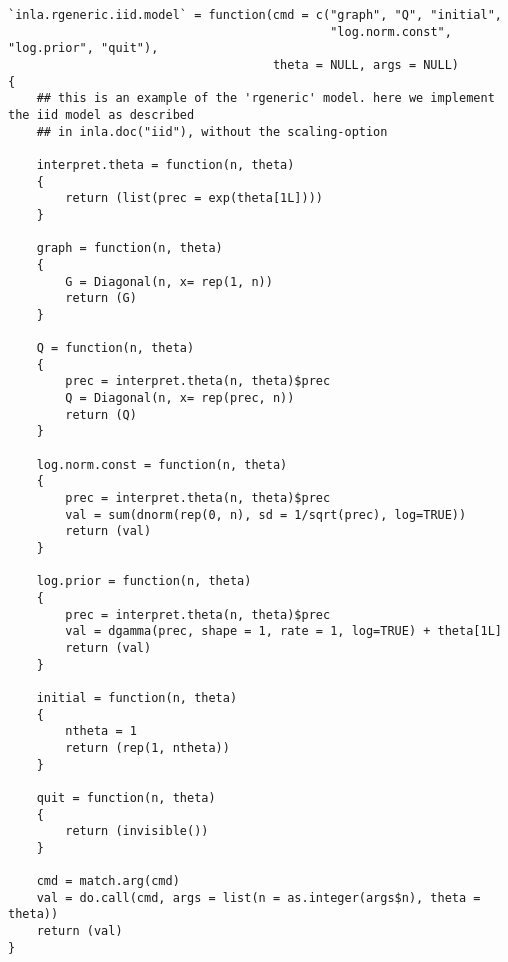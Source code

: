 \documentclass[a4paper,11pt]{article}
\begin{document}
{\small
\begin{verbatim}
`inla.rgeneric.iid.model` = function(cmd = c("graph", "Q", "initial",
                                             "log.norm.const", "log.prior", "quit"),
                                     theta = NULL, args = NULL)
{
    ## this is an example of the 'rgeneric' model. here we implement the iid model as described
    ## in inla.doc("iid"), without the scaling-option

    interpret.theta = function(n, theta)
    {
        return (list(prec = exp(theta[1L])))
    }

    graph = function(n, theta)
    {
        G = Diagonal(n, x= rep(1, n))
        return (G)
    }

    Q = function(n, theta)
    {
        prec = interpret.theta(n, theta)$prec
        Q = Diagonal(n, x= rep(prec, n))
        return (Q)
    }

    log.norm.const = function(n, theta)
    {
        prec = interpret.theta(n, theta)$prec
        val = sum(dnorm(rep(0, n), sd = 1/sqrt(prec), log=TRUE))
        return (val)
    }

    log.prior = function(n, theta)
    {
        prec = interpret.theta(n, theta)$prec
        val = dgamma(prec, shape = 1, rate = 1, log=TRUE) + theta[1L]
        return (val)
    }

    initial = function(n, theta)
    {
        ntheta = 1
        return (rep(1, ntheta))
    }

    quit = function(n, theta)
    {
        return (invisible())
    }

    cmd = match.arg(cmd)
    val = do.call(cmd, args = list(n = as.integer(args$n), theta = theta))
    return (val)
}
\end{verbatim}
}
\end{document}

